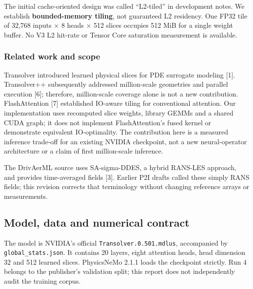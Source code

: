 \documentclass[
  10pt,
]{article}
\begin{document}
The initial cache-oriented design was called ``L2-tiled'' in development
notes. We establish \textbf{bounded-memory tiling}, not guaranteed L2
residency. One FP32 tile of 32,768 inputs × 8 heads × 512 slices
occupies 512 MiB for a single weight buffer. No V3 L2 hit-rate or Tensor
Core saturation measurement is available.

\subsubsection{Related work and scope}\label{related-work-and-scope}

Transolver introduced learned physical slices for PDE surrogate modeling
{[}1{]}. Transolver++ subsequently addressed million-scale geometries
and parallel execution {[}6{]}; therefore, million-scale coverage alone
is not a new contribution. FlashAttention {[}7{]} established IO-aware
tiling for conventional attention. Our implementation uses recomputed
slice weights, library GEMMs and a shared CUDA graph; it does not
implement FlashAttention's fused kernel or demonstrate equivalent
IO-optimality. The contribution here is a measured inference trade-off
for an existing NVIDIA checkpoint, not a new neural-operator
architecture or a claim of first million-scale inference.

The DrivAerML source uses SA-sigma-DDES, a hybrid RANS-LES approach, and
provides time-averaged fields {[}3{]}. Earlier P2I drafts called these
simply RANS fields; this revision corrects that terminology without
changing reference arrays or measurements.

\subsection{Model, data and numerical
contract}\label{model-data-and-numerical-contract}

The model is NVIDIA's official \texttt{Transolver.0.501.mdlus},
accompanied by \texttt{global\_stats.json}. It contains 20 layers, eight
attention heads, head dimension 32 and 512 learned slices. PhysicsNeMo
2.1.1 loads the checkpoint strictly. Run 4 belongs to the publisher's
validation split; this report does not independently audit the training
corpus.
\end{document}
